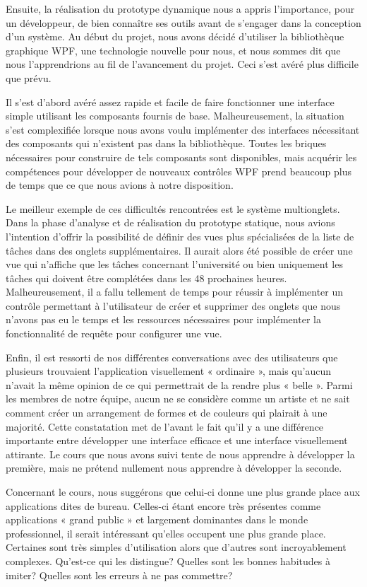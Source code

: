 \documentclass[letterpaper, oneside, 12pt, these, creativecommons]{thETS}
\begin{document}
Ensuite, la réalisation du prototype dynamique nous a appris l'importance, pour un développeur, de bien connaître ses outils avant de s'engager dans la conception d'un système. Au début du projet, nous avons décidé d'utiliser la bibliothèque graphique WPF, une technologie nouvelle pour nous, et nous sommes dit que nous l'apprendrions au fil de l'avancement du projet. Ceci s'est avéré plus difficile que prévu.

Il s'est d'abord avéré assez rapide et facile de faire fonctionner une interface simple utilisant les composants fournis de base. Malheureusement, la situation s'est complexifiée lorsque nous avons voulu implémenter des interfaces nécessitant des composants qui n'existent pas dans la bibliothèque. Toutes les briques nécessaires pour construire de tels composants sont disponibles, mais acquérir les compétences pour développer de nouveaux contrôles WPF prend beaucoup plus de temps que ce que nous avions à notre disposition.

Le meilleur exemple de ces difficultés rencontrées est le système multionglets. Dans la phase d'analyse et de réalisation du prototype statique, nous avions l'intention d'offrir la possibilité de définir des vues plus spécialisées de la liste de tâches dans des onglets supplémentaires. Il aurait alors été possible de créer une vue qui n'affiche que les tâches concernant l'université ou bien uniquement les tâches qui doivent être complétées dans les 48 prochaines heures. Malheureusement, il a fallu tellement de temps pour réussir à implémenter un contrôle permettant à l'utilisateur de créer et supprimer des onglets que nous n'avons pas eu le temps et les ressources nécessaires pour implémenter la fonctionnalité de requête pour configurer une vue.

Enfin, il est ressorti de nos différentes conversations avec des utilisateurs que plusieurs trouvaient l'application visuellement « ordinaire », mais qu'aucun n'avait la même opinion de ce qui permettrait de la rendre plus « belle ». Parmi les membres de notre équipe, aucun ne se considère comme un artiste et ne sait comment créer un arrangement de formes et de couleurs qui plairait à une majorité. Cette constatation met de l'avant le fait qu'il y a une différence importante entre développer une interface efficace et une interface visuellement attirante. Le cours que nous avons suivi tente de nous apprendre à développer la première, mais ne prétend nullement nous apprendre à développer la seconde.

Concernant le cours, nous suggérons que celui-ci donne une plus grande place aux applications dites de bureau. Celles-ci étant encore très présentes comme applications « grand public » et largement dominantes dans le monde professionnel, il serait intéressant qu'elles occupent une plus grande place. Certaines sont très simples d'utilisation alors que d'autres sont incroyablement complexes. Qu'est-ce qui les distingue? Quelles sont les bonnes habitudes à imiter? Quelles sont les erreurs à ne pas commettre?
\end{document}
